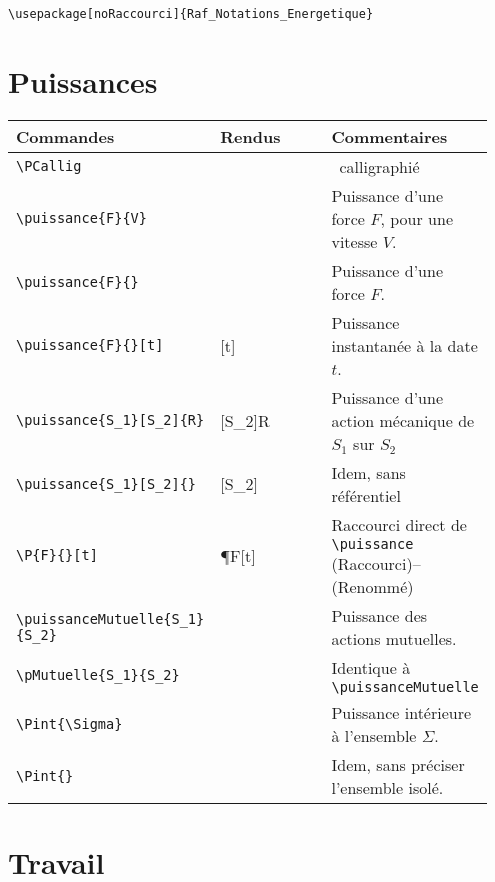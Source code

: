 \documentclass[a4paper,10pt]{article}
\newcommand{\rac}{({\color{red}Raccourci})}
\newcommand{\ren}{({\color{blue}Renommé})}
\begin{document}
	\begin{verbatim}
\usepackage[noRaccourci]{Raf_Notations_Energetique}
	\end{verbatim}

	\section{Puissances}
	\noindent
	
	\begin{tabular}{|p{0.35\linewidth}|p{0.3\linewidth}|p{0.3\linewidth}|}
		\hline
			\textbf{Commandes}&\textbf{Rendus}&\textbf{Commentaires}
		\\\hline\hline
			\verb!\PCallig!			&	\PCallig			&	\PCallig\ calligraphié
		\\\hline
			\verb!\puissance{F}{V}!		&	\puissance{F}{V}		&	Puissance d'une force $F$, pour une vitesse $V$.
		\\\hline
			\verb!\puissance{F}{}!		&	\puissance{F}{}			&	Puissance d'une force $F$.
		\\\hline
			\verb!\puissance{F}{}[t]!	&	\puissance{F}{}[t]		&	Puissance instantanée à la date $t$.
		\\\hline
			\verb!\puissance{S_1}[S_2]{R}!		&	\puissance{S_1}[S_2]{R}			&	Puissance d'une action mécanique de $S_1$ sur $S_2$
		\\\hline
			\verb!\puissance{S_1}[S_2]{}!		&	\puissance{S_1}[S_2]{}			&	Idem, sans référentiel
		\\\hline
			\verb!\P{F}{}[t]!		&	\P{F}{}[t]			&	Raccourci direct de \verb!\puissance! \rac -- \ren
		\\\hline
			\verb!\puissanceMutuelle{S_1}! \verb!{S_2}!		&	\puissanceMutuelle{S_1}{S_2}			&	Puissance des actions mutuelles.
		\\\hline
			\verb!\pMutuelle{S_1}{S_2}!		&	\pMutuelle{S_1}{S_2}			&	Identique à \verb!\puissanceMutuelle!
		\\\hline
			\verb!\Pint{\Sigma}!		&	\Pint{\Sigma}			&	Puissance intérieure à l'ensemble $\Sigma$.
		\\\hline
			\verb!\Pint{}!		&	\Pint{}			&	Idem, sans préciser l'ensemble isolé.
		\\\hline
	\end{tabular}


	\section{Travail}
	\noindent
	
\end{document}
